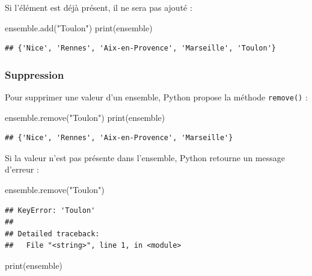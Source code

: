 \documentclass[12pt,]{book}
\newenvironment{Shaded}{\begin{snugshade}}{\end{snugshade}}
\newcommand{\StringTok}[1]{\textcolor[rgb]{0.31,0.60,0.02}{#1}}
\newcommand{\BuiltInTok}[1]{#1}
\newcommand{\NormalTok}[1]{#1}
\numberwithin{equation}{section}
\numberwithin{countremarque}{section}
\begin{document}
Si l'élément est déjà présent, il ne sera pas ajouté :

\begin{Shaded}
\begin{Highlighting}[]
\NormalTok{ensemble.add(}\StringTok{"Toulon"}\NormalTok{)}
\BuiltInTok{print}\NormalTok{(ensemble)}
\end{Highlighting}
\end{Shaded}

\begin{lstlisting}
## {'Nice', 'Rennes', 'Aix-en-Provence', 'Marseille', 'Toulon'}
\end{lstlisting}

\subsubsection{Suppression}\label{suppression}

Pour supprimer une valeur d'un ensemble, Python propose la méthode
\texttt{remove()} :

\begin{Shaded}
\begin{Highlighting}[]
\NormalTok{ensemble.remove(}\StringTok{"Toulon"}\NormalTok{)}
\BuiltInTok{print}\NormalTok{(ensemble)}
\end{Highlighting}
\end{Shaded}

\begin{lstlisting}
## {'Nice', 'Rennes', 'Aix-en-Provence', 'Marseille'}
\end{lstlisting}

Si la valeur n'est pas présente dans l'ensemble, Python retourne un
message d'erreur :

\begin{Shaded}
\begin{Highlighting}[]
\NormalTok{ensemble.remove(}\StringTok{"Toulon"}\NormalTok{)}
\end{Highlighting}
\end{Shaded}

\begin{lstlisting}
## KeyError: 'Toulon'
## 
## Detailed traceback: 
##   File "<string>", line 1, in <module>
\end{lstlisting}

\begin{Shaded}
\begin{Highlighting}[]
\BuiltInTok{print}\NormalTok{(ensemble)}
\end{Highlighting}
\end{Shaded}
\end{document}
